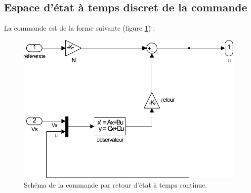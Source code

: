 	\subsection{Espace d'état à temps discret de la commande}
La commande est de la forme suivante (figure \ref{fig:comTC}) : 
\begin{figure}[!ht]
\centering
\includegraphics[width=.4\textwidth]{./V/images/Com_asserv.pdf}
\caption{\label{fig:comTC}Schéma de la commande par retour d'état à temps continue.}
\end{figure}


